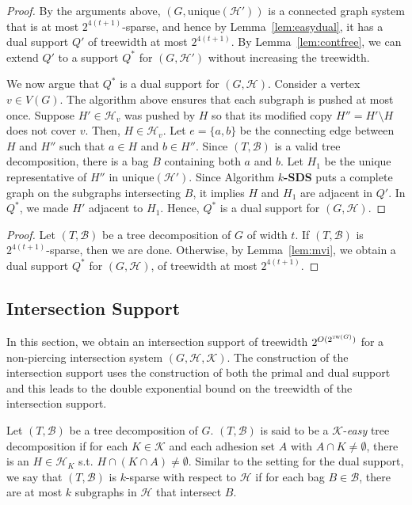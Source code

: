 \documentclass[12pt]{article}
\newcommand{\HH}{\mathcal{H}}
\newcommand{\KK}{\mathcal{K}}
\newcommand{\tw}{\textsc{tw}}
\newcommand{\unique}{\textrm{unique}}
\theoremstyle{case}
\begin{document}
\begin{proof}
By the arguments above, $(G,\unique(\mathcal{H}'))$ is a connected
graph system that is at most $2^{4(t+1)}$-sparse, and hence by 
Lemma~\ref{lem:easydual}, it has a dual support $Q'$ of treewidth at most
$2^{4(t+1)}$. By Lemma~\ref{lem:contfree},
we can extend $Q'$ to a support $Q^*$ for $(G,\mathcal{H}')$ without
increasing the treewidth.

We now argue that $Q^*$ is a dual support for
$(G,\mathcal{H})$. Consider a vertex $v\in V(G)$. 
The algorithm above ensures that each subgraph is pushed at most once.
Suppose $H'\in\mathcal{H}_v$ was pushed by $H$ so that its modified copy $H''=H'\setminus H$
does not cover $v$. Then, $H\in\mathcal{H}_v$.
Let $e =\{a,b\}$ be the connecting edge between $H$ and $H''$ such that $a\in H$ and $b\in H''$.
Since $(T,\mathcal{B})$
is a valid tree decomposition, there is a bag $B$ containing both $a$ and $b$.
Let $H_1$ be the unique representative of $H''$ in $\unique(\HH')$.
Since Algorithm {\bf $k$-SDS} puts a complete graph on the subgraphs intersecting
$B$, it implies $H$ and $H_1$ are adjacent in $Q'$.
In $Q^*$, we made $H'$ adjacent to $H_1$.
Hence, $Q^*$ is a dual support for $(G,\HH)$.
\end{proof}

\dualsupporttw*
\begin{proof}
Let $(T,\mathcal{B})$ be a tree decomposition of $G$ of width $t$. 
If $(T,\mathcal{B})$ is $2^{4(t+1)}$-sparse, then we are done.
Otherwise, by Lemma~\ref{lem:mvi}, we obtain a dual support $Q^*$ for $(G,\mathcal{H})$,
of treewidth at most $2^{4(t+1)}$.
\end{proof}

\subsection{Intersection Support}\label{sec:intsupporttw}
In this section, we obtain an intersection support of treewidth $2^{O(2^{\tw(G)})}$ for a non-piercing intersection system $(G,\mathcal{H},\mathcal{K})$.
The construction of the intersection support uses the construction of both the primal and dual support and this leads to the double exponential bound
on the treewidth of the intersection support.


Let $(T,\mathcal{B})$ be a tree decomposition of $G$.
$(T,\mathcal{B})$ is said to be a $\KK$-\emph{easy} tree decomposition if
for each $K\in\mathcal{K}$ and each adhesion set $A$ with $A\cap K\neq\emptyset$, there is an $H\in\mathcal{H}_K$
s.t. $H\cap (K\cap A)\neq\emptyset$.
Similar to the setting for the dual support, we say that $(T,\mathcal{B})$ is $k$-sparse with respect to $\mathcal{H}$
if for each bag $B\in\mathcal{B}$, there are at most $k$ subgraphs in $\HH$ that intersect $B$.
\end{document}

